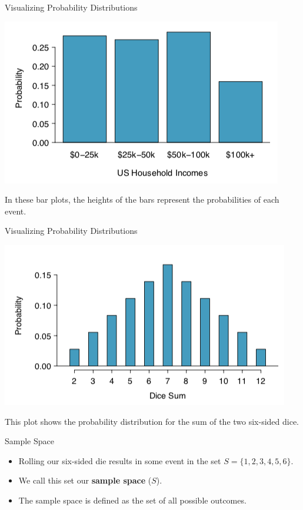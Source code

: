 \begin{frame}{Visualizing Probability Distributions}
    \begin{center}
        \includegraphics[scale=0.4]{images/probplot.png}
    \end{center}
    In these bar plots, the heights of the bars represent the probabilities of each event.
\end{frame}

\begin{frame}{Visualizing Probability Distributions}
    \begin{center}
        \includegraphics[scale=0.5]{images/dicesumplot.png}
    \end{center}
    This plot shows the probability distribution for the sum of the two six-sided dice.
\end{frame}

\begin{frame}{Sample Space}
    \begin{itemize}
        \item Rolling our six-sided die results in some event in the set $S=\{1,2,3,4,5,6\}$.
        \item We call this set our \textbf{sample space} ($S$). 
        \item The sample space is defined as the set of all possible outcomes.
    \end{itemize}
\end{frame}

